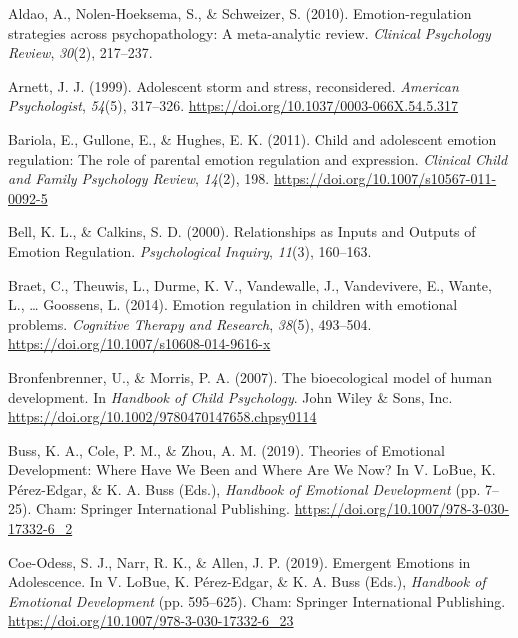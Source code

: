 \documentclass[
  english,
  man]{apa6}
\begin{document}
\leavevmode\hypertarget{ref-aldaoEmotionregulationStrategiesPsychopathology2010}{}%
Aldao, A., Nolen-Hoeksema, S., \& Schweizer, S. (2010). Emotion-regulation strategies across psychopathology: A meta-analytic review. \emph{Clinical Psychology Review}, \emph{30}(2), 217--237.

\leavevmode\hypertarget{ref-arnettAdolescentStormStress1999}{}%
Arnett, J. J. (1999). Adolescent storm and stress, reconsidered. \emph{American Psychologist}, \emph{54}(5), 317--326. \url{https://doi.org/10.1037/0003-066X.54.5.317}

\leavevmode\hypertarget{ref-bariolaChildAdolescentEmotion2011}{}%
Bariola, E., Gullone, E., \& Hughes, E. K. (2011). Child and adolescent emotion regulation: The role of parental emotion regulation and expression. \emph{Clinical Child and Family Psychology Review}, \emph{14}(2), 198. \url{https://doi.org/10.1007/s10567-011-0092-5}

\leavevmode\hypertarget{ref-bellRelationshipsInputsOutputs2000}{}%
Bell, K. L., \& Calkins, S. D. (2000). Relationships as Inputs and Outputs of Emotion Regulation. \emph{Psychological Inquiry}, \emph{11}(3), 160--163.

\leavevmode\hypertarget{ref-braetEmotionRegulationChildren2014}{}%
Braet, C., Theuwis, L., Durme, K. V., Vandewalle, J., Vandevivere, E., Wante, L., \ldots{} Goossens, L. (2014). Emotion regulation in children with emotional problems. \emph{Cognitive Therapy and Research}, \emph{38}(5), 493--504. \url{https://doi.org/10.1007/s10608-014-9616-x}

\leavevmode\hypertarget{ref-bronfenbrennerBioecologicalModelHuman2007}{}%
Bronfenbrenner, U., \& Morris, P. A. (2007). The bioecological model of human development. In \emph{Handbook of Child Psychology}. John Wiley \& Sons, Inc. \url{https://doi.org/10.1002/9780470147658.chpsy0114}

\leavevmode\hypertarget{ref-bussTheoriesEmotionalDevelopment2019}{}%
Buss, K. A., Cole, P. M., \& Zhou, A. M. (2019). Theories of Emotional Development: Where Have We Been and Where Are We Now? In V. LoBue, K. Pérez-Edgar, \& K. A. Buss (Eds.), \emph{Handbook of Emotional Development} (pp. 7--25). Cham: Springer International Publishing. \url{https://doi.org/10.1007/978-3-030-17332-6_2}

\leavevmode\hypertarget{ref-coe-odessEmergentEmotionsAdolescence2019}{}%
Coe-Odess, S. J., Narr, R. K., \& Allen, J. P. (2019). Emergent Emotions in Adolescence. In V. LoBue, K. Pérez-Edgar, \& K. A. Buss (Eds.), \emph{Handbook of Emotional Development} (pp. 595--625). Cham: Springer International Publishing. \url{https://doi.org/10.1007/978-3-030-17332-6_23}
\end{document}
